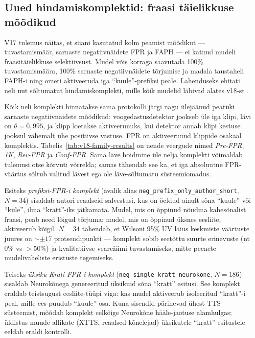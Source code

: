 \subsection{Uued hindamiskomplektid: fraasi täielikkuse mõõdikud}
\label{sec:phrase-selectivity-metrics}

V17 tulemus näitas, et siiani kasutatud kolm peamist mõõdikut --- tuvastamismäär, sarnaste negatiivnäidete FPR ja FAPH --- ei katnud mudeli fraasitäielikkuse selektiivsust. Mudel võis korraga saavutada 100\% tuvastamismäära, 100\% sarnaste negatiivnäidete tõrjumise ja madala taustaheli FAPH-i ning ometi aktiveeruda iga \enquote{kuule}-prefiksi peale. Lahenduseks ehitati neli uut sõltumatut hindamiskomplekti, mille kõik mudelid läbivad alates v18-st \cite{shrivastava2021optimize,chen2021fakewake,zhang2025graphemeaug}.

Kõik neli komplekti hinnatakse sama protokolli järgi nagu ülejäänud peatüki sarnaste negatiivnäidete mõõdikud: voogedastusdetektor jookseb üle iga klipi, lävi on $\theta=0{,}995$, ja klipp loetakse aktiveerunuks, kui detektor annab klipi kestuse jooksul vähemalt ühe positiivse vastuse. FPR on aktiveerunud klippide osakaal komplektis. Tabelis~\ref{tab:v18-family-results} on nende veergude nimed \emph{Pre-FPR}, \emph{1K}, \emph{Rev-FPR} ja \emph{Conf-FPR}. Sama läve hoidmine üle nelja komplekti võimaldab tulemusi otse kõrvuti võrrelda; samas tähendab see ka, et iga absoluutne FPR-väärtus sõltub valitud lävest ega ole läve-sõltumatu süsteemiomadus.

Esiteks \emph{prefiksi-FPR-i komplekt} (avalik alias \texttt{neg\_prefix\_only\_author\_short}, $N=34$) sisaldab autori reaalseid salvestusi, kus on öeldud ainult sõna \enquote{kuule} või \enquote{kule}, ilma \enquote{kratt}-iks jätkamata. Mudel, mis on õppinud nõudma kahesõnalist fraasi, peab need lõigud tõrjuma; mudel, mis on õppinud üksnes eesliite, aktiveerub kõigil. $N=34$ tähendab, et Wilsoni 95\% UV laius keskmiste väärtuste juures on ${\sim}\pm17$ protsendipunkti --- komplekt sobib seetõttu suurte erinevuste (nt 0\% vs $>$50\%) ja kvalitatiivse vearežiimi tuvastamiseks, mitte peenete mudelivaheliste eristuste tegemiseks.

Teiseks \emph{üksiku Krati FPR-i komplekt} (\texttt{neg\_single\_kratt\_neurokone}, $N=186$) sisaldab Neurokõnega genereeritud üksikuid sõna \enquote{kratt} esitusi. See komplekt eraldab teistsugust eesliite-tüüpi viga: kas mudel aktiveerub isoleeritud \enquote{kratt}-i peal, mille ees puudub \enquote{kuule}-osa. Kuna sisendid pärinevad ühest TTS-süsteemist, mõõdab komplekt eelkõige Neurokõne hääle-jaotuse alamhulgas; üldistus muude allikate (XTTS, reaalsed kõnelejad) üksikutele \enquote{kratt}-esitustele eeldab eraldi kontrolli.


